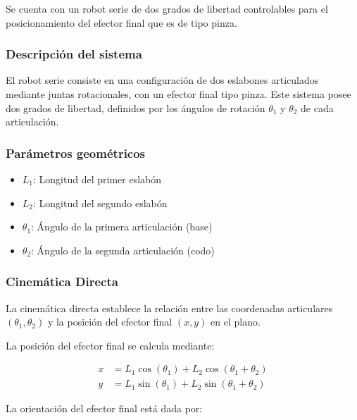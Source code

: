 Se cuenta con un robot serie de dos grados de libertad controlables para el posicionamiento del efector final que es de tipo pinza.

\subsubsection{Descripción del sistema}
\label{sec:desc_brazo}

El robot serie consiste en una configuración de dos eslabones articulados mediante juntas rotacionales, con un efector final tipo pinza. Este sistema posee dos grados de libertad, definidos por los ángulos de rotación $\theta_1$ y $\theta_2$ de cada articulación.

\subsubsection{Parámetros geométricos}
\label{sec:Param_brazo}

\begin{itemize}
    \item $L_1$: Longitud del primer eslabón
    \item $L_2$: Longitud del segundo eslabón
    \item $\theta_1$: Ángulo de la primera articulación (base)
    \item $\theta_2$: Ángulo de la segunda articulación (codo)
\end{itemize}

\subsubsection{Cinemática Directa}

La cinemática directa establece la relación entre las coordenadas articulares $(\theta_1, \theta_2)$ y la posición del efector final $(x, y)$ en el plano.

La posición del efector final se calcula mediante:

\begin{align}
    x &= L_1 \cos(\theta_1) + L_2 \cos(\theta_1 + \theta_2) \label{eq:x_cin_dir}\\
    y &= L_1 \sin(\theta_1) + L_2 \sin(\theta_1 + \theta_2) \label{eq:y_cin_dir}
\end{align}

La orientación del efector final está dada por:

